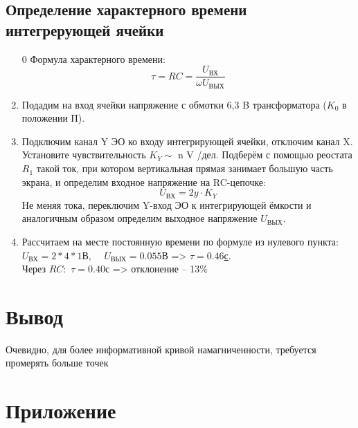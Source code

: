 \documentclass[14pt,a4paper]{article}
\begin{document}
\subsection*{Определение характерного времени интегрерующей ячейки}
\begin{enumerate}
  \item[0] Формула характерного времени:
  $$\tau = RC = \frac{U_\text{ВХ}}{\omega U_\text{ВЫХ}}$$
  \item Подадим на вход ячейки
  напряжение с обмотки 6,3 B трансформатора ($K_0$ в положении П).
  \item Подключим канал Y ЭО ко входу интегрирующей ячейки, отключим канал X. Установите чувствительность $K_Y \sim$ n V /дел. Подберём с помощью реостата $R_1$ такой ток, при котором вертикальная прямая занимает
  большую часть экрана, и определим входное напряжение на RC-цепочке:
  $$U_\text{ВХ} = 2y \cdot K_Y$$
  Не меняя тока, переключим Y-вход ЭО к интегрирующей ёмкости и
  аналогичным образом определим выходное напряжение $U_\text{ВЫХ}$.
  \item  Рассчитаем на месте постоянную времени по формуле из нулевого пункта:\\
  $U_\text{ВХ} = 2 * 4 * 1$В, \ \  $U_\text{ВЫХ} = 0.055$В => \underline{$\tau = 0.46$с}.\\
  Через $RC:$ $\tau = 0.40$с => отклонение -- 13\%
\end{enumerate}

\section*{Вывод}
Очевидно, для более информативной кривой намагниченности, требуется промерять больше точек

\newpage
\section*{Приложение}
\end{document}
